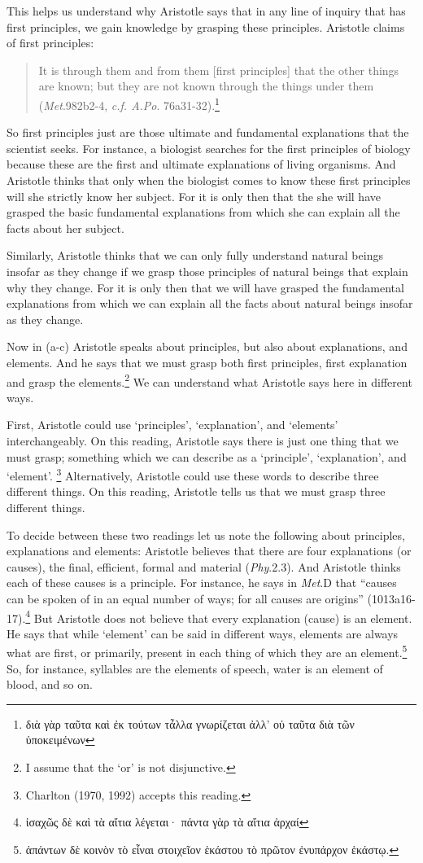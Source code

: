 \documentclass[10pt, oneside]{book}
\newcommand{\greek}[1]{{\selectlanguage{polutonikogreek}#1}}
\begin{document}
This helps us understand why Aristotle says that in any line of inquiry that has first principles, we gain knowledge by grasping these principles. Aristotle claims of first principles:
\begin{quote}
It is through them and from them [first principles] that the other things are known; but they are not known through the things under them (\emph{Met}.982b2-4, \emph{c.f. A.Po}. 76a31-32).\footnote{\greek{διὰ γὰρ ταῦτα καὶ ἐκ τούτων τἆλλα γνωρίζεται ἀλλ’ οὐ ταῦτα διὰ τῶν ὑποκειμένων}}%
\end{quote}
% 
So first principles just are those ultimate and fundamental explanations that the scientist seeks. For instance,  a biologist searches for the first principles of biology because these are the first and ultimate explanations of living organisms. And Aristotle thinks that only when the biologist comes to know these first principles will she strictly know her subject. For it is only then that the she will have grasped the basic fundamental explanations from which she can explain all the facts about her subject. 

Similarly, Aristotle thinks that we can only fully understand natural beings insofar as they change if we grasp those principles of natural beings that explain why they change. For it is only then that we will have grasped the fundamental explanations from which we can explain all the facts about natural beings insofar as they change.

Now  in (a-c) Aristotle speaks about principles, but also about explanations, and elements. And he says that we must grasp both first principles, first explanation and grasp the elements.\footnote{I assume that the `or' is not disjunctive.} We can understand what Aristotle says here in different ways. 

First, Aristotle could use `principles', `explanation', and `elements' interchangeably. On this reading, Aristotle says there is just one thing that we must grasp; something which we can describe as a `principle', `explanation', and `element'. \footnote{Charlton (1970, 1992) accepts this reading.} Alternatively, Aristotle could use these words to describe three different things. On this reading, Aristotle tells us that we must grasp three different things.

To decide between these two readings let us note the following about principles, explanations and elements: Aristotle believes that there are four explanations (or causes), the final, efficient, formal and material (\emph{Phy}.2.3). And Aristotle thinks each of these causes is a principle. For instance, he says in \emph{Met}.D that  ``causes can be spoken of in an equal number of ways; for all causes are origins'' (1013a16-17).\footnote{\greek{ἰσαχῶς δὲ καὶ τὰ αἴτια
λέγεται· πάντα γὰρ τὰ αἴτια ἀρχαί}} But Aristotle does not believe that every explanation (cause) is an element. He says that while `element' can be said in different ways, elements are always  what are first, or primarily, present in each thing of which they are an element.\footnote{\greek{ἁπάντων δὲ κοινὸν τὸ εἶναι στοιχεῖον ἑκάστου τὸ πρῶτον ἐνυπάρχον ἑκάστῳ.}} So, for instance, syllables are the elements of speech, water is an element of blood, and so on. 
\end{document}
